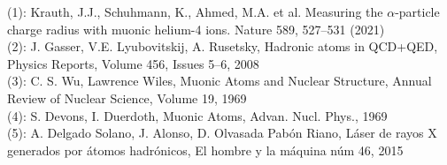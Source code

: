 \documentclass[preview]{standalone}
\begin{document}
\begin{center}
(1): Krauth, J.J., Schuhmann, K., Ahmed, M.A. et al. Measuring the $\alpha$-particle charge radius with muonic helium-4 ions. Nature 589, 527–531 (2021)\\ (2): J. Gasser, V.E. Lyubovitskij, A. Rusetsky, Hadronic atoms in QCD+QED, Physics Reports, Volume 456, Issues 5–6, 2008\\ (3): C. S. Wu, Lawrence Wiles, Muonic Atoms and Nuclear Structure, Annual Review of Nuclear Science, Volume 19, 1969\\ (4): S. Devons, I. Duerdoth, Muonic Atoms, Advan. Nucl. Phys., 1969\\ (5): A. Delgado Solano, J. Alonso, D. Olvasada Pabón Riano, Láser de rayos X generados por átomos hadrónicos, El hombre y la máquina núm 46, 2015
\end{center}
\end{document}
